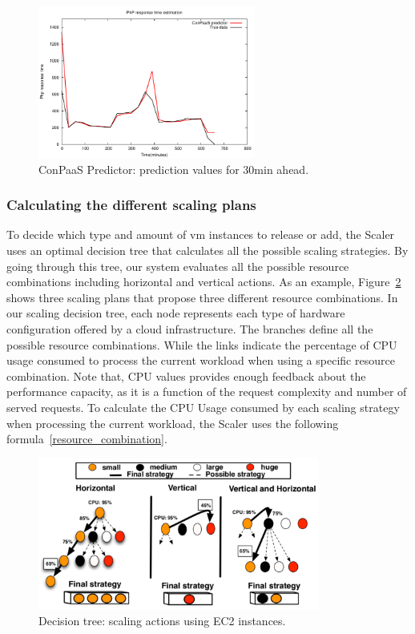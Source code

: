 \begin{figure}[htb]
  \begin{center}
    \includegraphics[height=5cm]{images/prediction_conpaas_30min}
  \end{center}
\vspace{-5mm}
  \caption{ConPaaS Predictor: prediction values for 30min ahead.}
  \label{fig:forecast}
\end{figure}

\subsubsection{Calculating the different scaling plans}
To decide which type and amount of vm instances to release or add, the Scaler uses an optimal decision tree that calculates all the possible scaling strategies. By going through this tree, our system evaluates all the possible resource combinations including horizontal and vertical actions. As an example, Figure~\ref{fig:scalingTree} shows three scaling plans that propose three different resource combinations. In our scaling decision tree, each node represents each type of hardware configuration offered by a cloud infrastructure. The branches define all the possible resource combinations. While the links indicate the percentage of CPU usage consumed to process the current workload when using a specific resource combination. Note that, CPU values provides enough feedback about the performance capacity, as it is a function of the request complexity  and number of served requests. To calculate the CPU Usage consumed by each scaling strategy when processing the current workload, the Scaler uses the following formula~\ref{resource_combination}. 

\begin{figure}[htb]
  \begin{center}
    \includegraphics[width=\linewidth,height=5cm]{images/scalingTree}
  \end{center}
\vspace{-5mm}
  \caption{Decision tree: scaling actions using EC2 instances.}
  \label{fig:scalingTree}
\end{figure}


